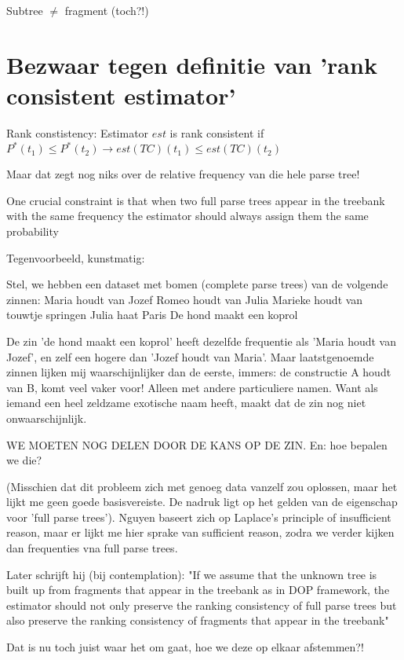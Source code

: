 \documentclass{article}
\begin{document}
\section{}
Subtree $\neq$ fragment (toch?!)
\section{Bezwaar tegen definitie van 'rank consistent estimator'}

Rank constistency:
Estimator $est$ is rank consistent if 
$P^*(t_1)\leq P^*(t_2)\rightarrow est(TC)(t_1)\leq est(TC)(t_2)$
 
Maar dat zegt nog niks over de relative frequency van die hele parse tree!

One crucial constraint is that when two full parse trees appear in the treebank with the same frequency the estimator should always assign them the same probability

Tegenvoorbeeld, kunstmatig:

Stel, we hebben een dataset met bomen (complete parse trees) van de volgende zinnen:
Maria houdt van Jozef
Romeo houdt van Julia
Marieke houdt van touwtje springen
Julia haat Paris
De hond maakt een koprol

De zin 'de hond maakt een koprol' heeft dezelfde frequentie als 'Maria houdt van Jozef', en zelf een hogere dan 'Jozef houdt van Maria'. Maar laatstgenoemde zinnen lijken mij waarschijnlijker dan de eerste, immers: de constructie A houdt van B, komt veel vaker voor! Alleen met andere particuliere namen. Want als iemand een heel zeldzame exotische naam heeft, maakt dat de zin nog niet onwaarschijnlijk.

WE MOETEN NOG DELEN DOOR DE KANS OP DE ZIN. En: hoe bepalen we die?

(Misschien dat dit probleem zich met genoeg data vanzelf zou oplossen, maar het lijkt me geen goede basisvereiste. De nadruk ligt op het gelden van de eigenschap voor 'full parse trees'). Nguyen baseert zich op Laplace's principle of insufficient reason, maar er lijkt me hier sprake van sufficient reason, zodra we verder kijken dan frequenties vna full parse trees.

Later schrijft hij (bij contemplation): "If we assume that the unknown tree is built up from fragments that appear in the treebank as in DOP framework, the estimator should not only preserve the ranking consistency of full parse trees but also preserve the ranking consistency of fragments that appear in the treebank"

Dat is nu toch juist waar het om gaat, hoe we deze op elkaar afstemmen?!
\end{document}
